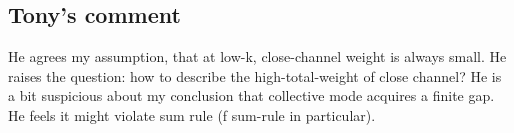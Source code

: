 \subsection{Tony's comment}
He agrees my assumption, that at low-k, close-channel weight is always small.  He raises the question: how to describe the high-total-weight of close channel?  He is a bit suspicious about my conclusion that collective mode acquires a finite gap.  He feels it might violate sum rule (f sum-rule in particular).